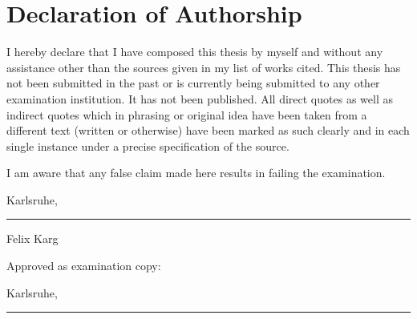 \chapter*{Declaration of Authorship}

I hereby declare that I have composed this thesis by myself and without any
assistance other than the sources given in my list of works cited. This thesis
has not been submitted in the past or is currently being submitted to any other
examination institution. It has not been published. All direct quotes as well
as indirect quotes which in phrasing or original idea have been taken from a
different text (written or otherwise) have been marked as such clearly and in
each single instance under a precise specification of the source.

I am aware that any false claim made here results in failing the examination.

\vspace{1cm}

\noindent Karlsruhe, \longdate \hfill \parbox[t]{.5\linewidth}{\rule[-3pt]{\linewidth}{.4pt}\par\smallskip
    \centering Felix Karg}

\vfill

Approved as examination copy:\\

\vspace{1cm}

\noindent Karlsruhe, \longdate \hfill \parbox[t]{.5\linewidth}{\rule[-3pt]{\linewidth}{.4pt}\par\smallskip
    \centering}

\renewcommand{\arraystretch}{1}

\cleardoublepage
